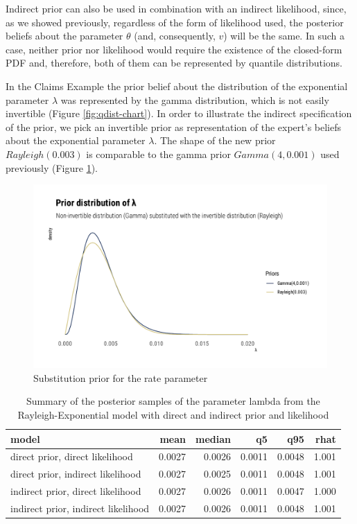 \documentclass[ba]{imsart}
\numberwithin{equation}{section}
\theoremstyle{plain}
\begin{document}
Indirect prior can also be used in combination with an indirect likelihood, since, as we showed previously, regardless of the form of likelihood used, the posterior beliefs about the parameter \(\theta\) (and, consequently, \(v\)) will be the same. In such a case, neither prior nor likelihood would require the existence of the closed-form PDF and, therefore, both of them can be represented by quantile distributions.

In the Claims Example the prior belief about the distribution of the exponential parameter \(\lambda\) was represented by the gamma distribution, which is not easily invertible (Figure \ref{fig:qdist-chart}). In order to illustrate the indirect specification of the prior, we pick an invertible prior as representation of the expert's beliefs about the exponential parameter \(\lambda\). The shape of the new prior \(Rayleigh(0.003)\) is comparable to the gamma prior \(Gamma(4,0.001)\) used previously (Figure \ref{fig:gamma-ray-prior-graph}).

\begin{figure}

{\centering \includegraphics[width=0.8\linewidth]{BA-submission_files/figure-latex/gamma-ray-prior-graph-1} 

}

\caption{Substitution prior for the rate parameter}\label{fig:gamma-ray-prior-graph}
\end{figure}

\begin{table}[!h]

\caption{\label{tab:rexp-prior-lik-tab}Summary of the posterior samples of the parameter lambda from the Rayleigh-Exponential model with direct and indirect prior and likelihood}
\centering
\begin{tabular}[t]{lrrrrr}
\toprule
model & mean & median & q5 & q95 & rhat\\
\midrule
direct prior, direct likelihood & 0.0027 & 0.0026 & 0.0011 & 0.0048 & 1.001\\
direct prior, indirect likelihood & 0.0027 & 0.0025 & 0.0011 & 0.0048 & 1.001\\
indirect prior, direct likelihood & 0.0027 & 0.0026 & 0.0011 & 0.0047 & 1.000\\
indirect prior, indirect likelihood & 0.0027 & 0.0026 & 0.0011 & 0.0048 & 1.001\\
\bottomrule
\end{tabular}
\end{table}
\end{document}
